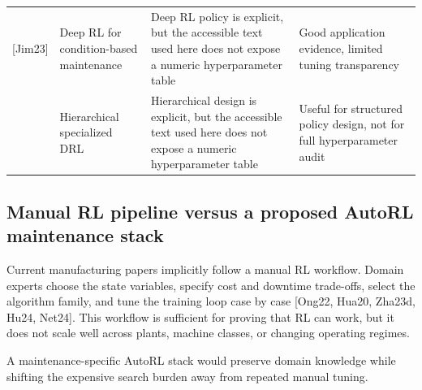 \begin{table}[htbp]
\begin{tabular}{p{} p{} p{} p{}}
[Jim23] & Deep RL for condition-based maintenance & Deep RL policy is explicit, but the accessible text used here does not expose a numeric hyperparameter table & Good application evidence, limited tuning transparency \\
[Abb23] & Hierarchical specialized DRL & Hierarchical design is explicit, but the accessible text used here does not expose a numeric hyperparameter table & Useful for structured policy design, not for full hyperparameter audit \\
\hline
\end{tabular}
\end{table}

\subsection{Manual RL pipeline versus a proposed AutoRL maintenance stack}

Current manufacturing papers implicitly follow a manual RL workflow. Domain experts choose the state variables, specify cost and downtime trade-offs, select the algorithm family, and tune the training loop case by case [Ong22, Hua20, Zha23d, Hu24, Net24]. This workflow is sufficient for proving that RL can work, but it does not scale well across plants, machine classes, or changing operating regimes.

A maintenance-specific AutoRL stack would preserve domain knowledge while shifting the expensive search burden away from repeated manual tuning.

